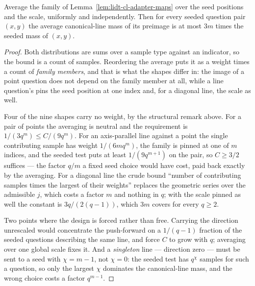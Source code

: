 \begin{lemma}
\label{lem:lidt-cl-adapter-weights}
\leanok
Average the family of Lemma~\ref{lem:lidt-cl-adapter-maps} over the seed positions and the scale,
uniformly and independently. Then for every seeded question pair $(x,y)$ the average
canonical-line mass of its preimage is at most $3m$ times the seeded mass of $(x,y)$.
\end{lemma}

\begin{proof}
\leanok
Both distributions are sums over a sample type against an indicator, so the bound is a count of
samples. Reordering the average puts it as a weight times a count of \emph{family members}, and
that is what the shapes differ in: the image of a point question does not depend on the family
member at all, while a line question's pins the seed position at one index and, for a diagonal
line, the scale as well.

Four of the nine shapes carry no weight, by the structural remark above. For a pair of points the
averaging is neutral and the requirement is $1/(3q^m)\leq C/(9q^m)$. For an axis-parallel line
against a point the single contributing sample has weight $1/(6mq^m)$, the family is pinned at one
of $m$ indices, and the seeded test puts at least $1/(9q^{m+1})$ on the pair, so $C\geq3/2$
suffices --- the factor $q/m$ a fixed seed choice would have cost, paid back exactly by the
averaging. For a diagonal line the crude bound ``number of contributing samples times the largest
of their weights'' replaces the geometric series over the admissible $j$, which costs a factor
$m$ and nothing in $q$; with the scale pinned as well the constant is $3q/(2(q-1))$, which $3m$
covers for every $q\geq2$.

Two points where the design is forced rather than free. Carrying the direction unrescaled would
concentrate the push-forward on a $1/(q-1)$ fraction of the seeded questions describing the same
line, and force $C$ to grow with $q$; averaging over one global scale fixes it. And a
\emph{singleton} line --- direction zero --- must be sent to a seed with $\chi=m-1$, not $\chi=0$:
the seeded test has $q^{\chi}$ samples for such a question, so only the largest $\chi$ dominates
the canonical-line mass, and the wrong choice costs a factor $q^{m-1}$.
\end{proof}

